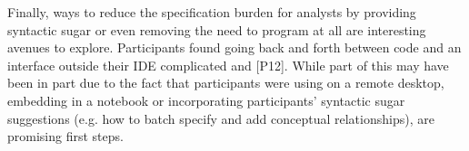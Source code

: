 Finally, ways to reduce the specification burden for analysts by providing
syntactic sugar or even removing the need to program at all are interesting
avenues to explore. Participants found going back and forth between code and an
interface outside their IDE complicated and  [P12]. While
part of this may have been in part due to the fact that participants were using
\rTisane on a remote desktop, embedding \rTisane in a notebook or incorporating
participants' syntactic sugar suggestions (e.g. how to batch specify and add
conceptual relationships), are promising first steps. 